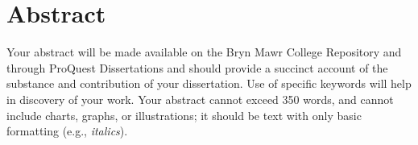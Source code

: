 \chapter*{Abstract}
Your abstract will be made available on the Bryn Mawr College Repository and
through ProQuest Dissertations and should provide a succinct account of the substance
and contribution of your dissertation. Use of specific keywords will help in discovery of
your work. Your abstract cannot exceed 350 words, and cannot include charts, graphs, or
illustrations; it should be text with only basic formatting (e.g., \textit{italics}).
